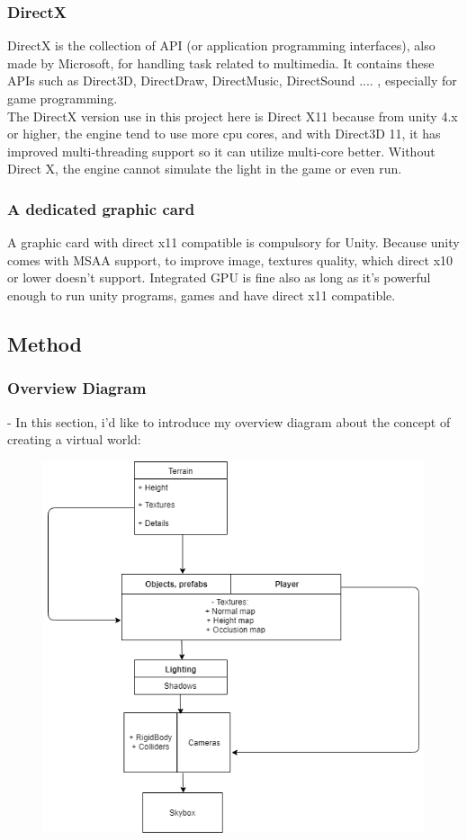 \documentclass[a4paper, 13pt]{extarticle}
\begin{document}
 		 \subsubsection{DirectX}
 		 DirectX is the collection of API (or  application programming interfaces), also made by Microsoft, for handling task related to multimedia. It contains these APIs such as Direct3D, DirectDraw, DirectMusic, DirectSound .... , especially for game programming. \\[0.15cm] The DirectX version use in this project here is Direct X11 because from unity 4.x or higher, the engine tend to use more cpu cores, and with Direct3D 11, it has improved multi-threading support so it can utilize multi-core better. Without Direct X, the engine cannot simulate the light in the game or even run. 
 		 \subsubsection{A dedicated graphic card}
 		 A graphic card with direct x11 compatible is compulsory for Unity. Because unity comes with MSAA support, to improve image, textures quality, which direct x10 or lower doesn't support. Integrated GPU is fine also as long as it's powerful enough to run unity programs, games and have direct x11 compatible. 
 		 
 		 \subsection{Method}  
 		 \subsubsection{Overview Diagram}
 		 - In this section, i'd like to introduce my overview diagram about the concept of creating a virtual world: \par
 		 
 		 	\begin{figure}[h]
 		 		\centering
 		 		\includegraphics[width=0.59\columnwidth]{Overview_diagram.png}
 		 		\label{fig:Overview1}
 		 	\end{figure}
 		 
\end{document}
